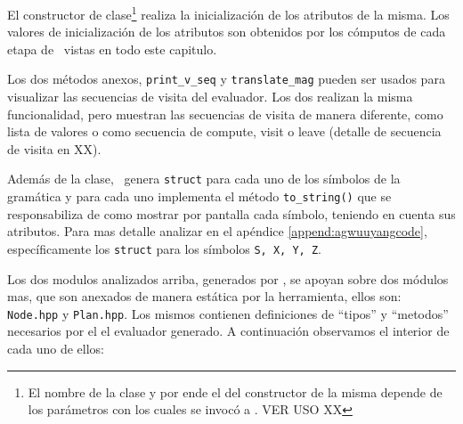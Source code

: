 \begin{description}
\begin{itemize}
El constructor de clase\footnote{El nombre de la clase y por ende el del constructor de la misma depende de los parámetros con los cuales se invocó a \maggen. VER USO XX} realiza la inicialización de los atributos de la misma. Los valores de inicialización de los atributos son obtenidos por los cómputos de cada etapa de \maggen\ vistas en todo este capitulo.

Los dos métodos anexos, \texttt{print\_v\_seq} y \texttt{translate\_mag} pueden ser usados para visualizar las secuencias de visita del evaluador. Los dos realizan la misma funcionalidad, pero muestran las secuencias de visita de manera diferente, como lista de valores o como secuencia de compute, visit o  leave (detalle de secuencia de visita en XX).
\end{itemize}
 
\end{description}

Además de la clase, \maggen\ genera \texttt{struct} para cada uno de los símbolos de la gramática y para cada uno implementa el método \texttt{to\_string()} que se responsabiliza de como mostrar por pantalla cada símbolo, teniendo en cuenta sus atributos. Para mas detalle analizar en el apéndice \ref{append:agwuuyangcode}, específicamente los \texttt{struct} para los símbolos \texttt{S, X, Y, Z}.

\normalsize
Los dos modulos analizados arriba, generados por \maggen, se apoyan sobre dos módulos mas, que son anexados de manera estática por la herramienta, ellos son: \texttt{Node.hpp} y \texttt{Plan.hpp}. Los mismos contienen definiciones de ``tipos'' y ``metodos'' necesarios por el el evaluador generado.
A continuación observamos el interior de cada uno de ellos:

\tiny


\tiny

\normalsize